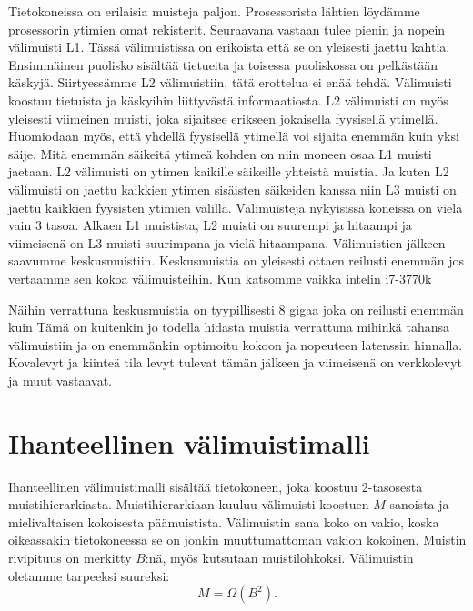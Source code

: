 \documentclass[finnish]{tktltiki2}
\theoremstyle{definition}
\theoremstyle{remark}
\begin{document}
Tietokoneissa on erilaisia muisteja paljon. Prosessorista lähtien löydämme
prosessorin ytimien omat rekisterit. Seuraavana vastaan tulee pienin ja nopein
välimuisti L1. Tässä välimuistissa on erikoista että se on yleisesti jaettu
kahtia. Ensimmäinen puolisko sisältää tietueita ja toisessa puoliskossa on
pelkästään käskyjä. Siirtyessämme L2 välimuistiin, tätä erottelua ei enää tehdä.
Välimuisti koostuu tietuista ja käskyihin liittyvästä informaatiosta. L2
välimuisti on myös yleisesti viimeinen muisti, joka sijaitsee erikseen
jokaisella fyysisellä ytimellä. Huomiodaan myös, että yhdellä fyysisellä
ytimellä voi sijaita enemmän kuin yksi säije.
Mitä enemmän säikeitä ytimeä kohden on niin moneen osaa L1 muisti jaetaan. L2
välimuisti on ytimen kaikille säikeille yhteistä muistia. Ja kuten L2 välimuisti on
jaettu kaikkien ytimen sisäisten säikeiden kanssa niin L3 muisti on
jaettu kaikkien fyysisten ytimien välillä. Välimuisteja nykyisissä koneissa on
vielä vain 3 tasoa. Alkaen L1 muistista, L2 muisti on suurempi ja hitaampi ja
viimeisenä on L3 muisti suurimpana ja vielä hitaampana.
  Välimuistien jälkeen saavumme keskusmuistiin. Keskusmuistia on yleisesti
ottaen reilusti enemmän jos vertaamme sen kokoa välimuisteihin. Kun katsomme
vaikka intelin i7-3770k %

Näihin verrattuna keskusmuistia on tyypillisesti 8 gigaa joka on reilusti
enemmän kuin %
Tämä on kuitenkin jo todella hidasta muistia verrattuna mihinkä tahansa
välimuistiin ja on enemmänkin optimoitu kokoon ja nopeuteen latenssin hinnalla.
Kovalevyt ja kiinteä tila levyt %
tulevat tämän jälkeen ja viimeisenä on verkkolevyt ja muut vastaavat.


\section{Ihanteellinen välimuistimalli}

Ihanteellinen välimuistimalli sisältää
tietokoneen, joka koostuu 2-tasosesta muistihierarkiasta. Muistihierarkiaan
kuuluu välimuisti koostuen $ M $ sanoista ja mielivaltaisen
kokoisesta päämuistista. Välimuistin sana koko on
vakio, koska oikeassakin tietokoneessa se on jonkin muuttumattoman vakion kokoinen.
Muistin rivipituus on merkitty $B$:nä, myös kutsutaan muistilohkoksi.
Välimuistin oletamme tarpeeksi suureksi:
\[
M=\Omega(B^2).
\]
\end{document}
